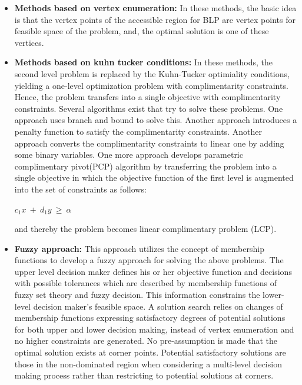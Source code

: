\documentclass[a4paper, 12pt]{article}
\begin{document}
\begin{itemize}
\item \textbf{Methods based on vertex enumeration:} In these methods, the basic idea is that the vertex points of the accessible region for BLP are vertex points for feasible space of the problem, and, the optimal solution is one of these vertices.
\item \textbf{Methods based on kuhn tucker conditions:} In these methods, the second level problem is replaced by the Kuhn-Tucker optimiality conditions, yielding a one-level optimization problem with complimentarity constraints. Hence, the problem transfers into a single objective with complimentarity constraints. Several algorithms exist that try to solve these problems. One approach uses branch and bound to solve this. Another approach introduces a penalty function to satisfy the complimentarity constraints. Another approach converts the complimentarity constraints to linear one by adding some binary variables. One more approach develops parametric complimentary pivot(PCP) algorithm by transferring the problem into a single objective in which the objective function of the first level is augmented into the set of constraints as follows:\\
\begin{center}
\begin{large}
$c_{1}x\ +\ d_{1}y\ \geq\ \alpha$
\end{large}
\end{center}
and thereby the problem becomes linear complimentary problem (LCP).
\item \textbf{Fuzzy approach:} This approach utilizes the concept of membership functions to develop a fuzzy approach for solving the above problems. The upper level decision maker defines his or her objective function and decisions with possible tolerances which are described by membership functions of fuzzy set theory and fuzzy decision. This information constrains the lower-level decision maker's feasible space. A solution search relies on changes of membership functions expressing satisfactory degrees of potential solutions for both upper and lower decision making, instead of vertex enumeration and no higher constraints are generated. No pre-assumption is made that the optimal solution exists at corner points. Potential satisfactory solutions are those in the non-dominated region when considering a multi-level decision making process rather than restricting to potential solutions at corners.

\end{itemize}
\end{document}
